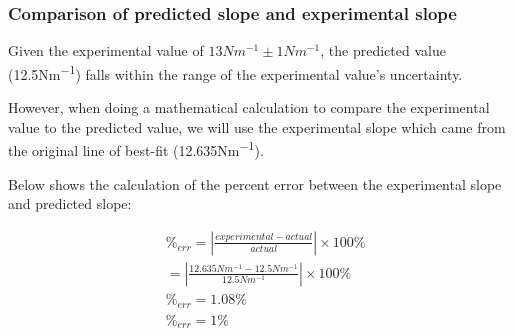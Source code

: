 \documentclass[letterpaper, 12pt]{article}
\begin{document}
\subsubsection{Comparison of predicted slope and experimental slope}

Given the experimental value of $13\unit{Nm^{-1}} \pm 1\unit{Nm^{-1}}$,
the predicted value (12.5\unit{Nm^{-1}}) falls within the range of the
experimental value's uncertainty.

However, when doing a mathematical calculation to compare the experimental
value to the predicted value, we will use the experimental slope which
came from the original line of best-fit (12.635\unit{Nm^{-1}}).

Below shows the calculation of the percent error between the experimental
slope and predicted slope:

\begin{align*}
     & \%_{err} = \left|\frac{experimental - actual}{actual}\right| \times 100\%
    \\
     & = \left|\frac{12.635\unit{Nm^{-1}} - 12.5\unit{Nm^{-1}}}{12.5\unit{Nm^{-1}}}\right| \times 100\%
    \\
     & \%_{err} = 1.08\%
    \\
     & \%_{err} = 1\%
\end{align*}
\end{document}
